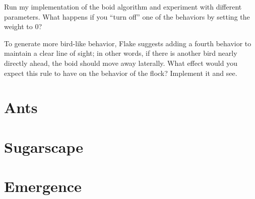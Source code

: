 \documentclass[10pt]{book}
\begin{document}
\begin{ex}

Run my implementation of the boid algorithm and experiment with
different parameters.  What happens if you ``turn off'' one
of the behaviors by setting the weight to 0?

To generate more bird-like behavior, 
Flake suggests adding a fourth behavior to maintain a clear
line of sight; in other words, if there is another bird nearly
directly ahead, the boid should move away laterally.  What effect
would you expect this rule to have on the behavior of the flock?
Implement it and see.

\end{ex}


\section{Ants}

\section{Sugarscape}

\section{Emergence}







\end{document}
